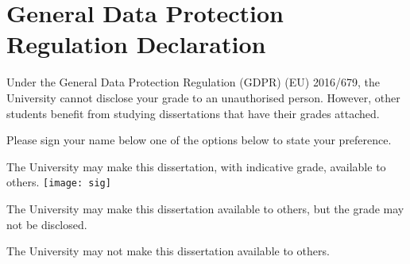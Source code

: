 
\section*{General Data Protection Regulation Declaration}
\vspace{0.5cm}
\begin{flushleft}
Under the General Data Protection Regulation (GDPR) (EU) 2016/679, the University cannot disclose your grade to an unauthorised person. However, other students benefit from studying dissertations that have their grades attached. \newline

\vspace{0.5cm}

Please sign your name below one of the options below to state your preference.\newline
\vspace{0.5cm}

The University may make this dissertation, with indicative grade, available to others.\newline
\vspace{3cm}
\texttt{[image: sig]}


The University may make this dissertation available to others, but the grade may not be disclosed.\newline
\vspace{3cm}


The University may not make this dissertation available to others.\newline
\end{flushleft}


